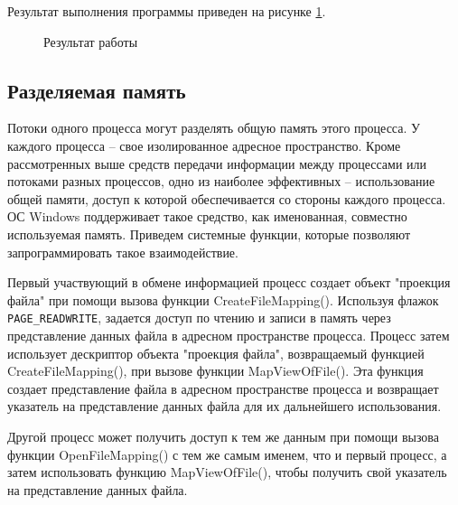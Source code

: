 \documentclass[a4paper]{article}
\begin{document}
	Результат выполнения программы приведен на рисунке \ref{img:task7}.
	\begin{figure}[h!]
		\caption{Результат работы}
		\label{img:task7}
	\end{figure}
	
\subsection{Разделяемая память}
	Потоки одного процесса могут разделять общую память этого процесса. У каждого процесса – свое изолированное адресное пространство. Кроме рассмотренных выше средств передачи информации между процессами или потоками разных процессов, одно из наиболее эффективных – использование общей памяти, доступ к которой обеспечивается со стороны каждого процесса. ОС Windows поддерживает такое средство, как именованная, совместно используемая память.
Приведем системные функции, которые позволяют запрограммировать такое взаимодействие.
	
	Первый участвующий в обмене информацией процесс создает объект "проекция файла" при помощи вызова функции CreateFileMapping(). Используя флажок \texttt{PAGE\_READWRITE}, задается доступ по чтению и записи в память через представление данных файла в адресном пространстве процесса. Процесс затем использует дескриптор объекта "проекция файла", возвращаемый функцией CreateFileMapping(), при вызове функции MapViewOfFile(). Эта функция создает представление файла в адресном пространстве процесса и возвращает указатель на представление данных файла для их дальнейшего использования.
	
	Другой процесс может получить доступ к тем же данным при помощи вызова функции OpenFileMapping() с тем же самым именем, что и первый процесс, а затем использовать функцию MapViewOfFile(), чтобы получить свой указатель на представление данных файла.
	
\end{document}
